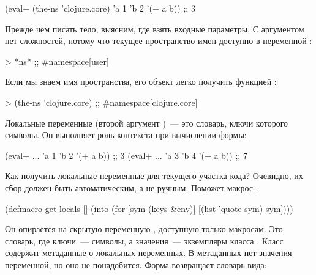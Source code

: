 \begin{english}
  \begin{clojure}
(eval+ (the-ns 'clojure.core)
       {'a 1 'b 2}
       '(+ a b))
;; 3
  \end{clojure}
\end{english}

Прежде чем писать тело, выясним, где взять входные параметры. С аргументом  нет сложностей, потому что текущее пространство имен доступно в переменной :

\begin{english}
  \begin{clojure}
> *ns*
;; #namespace[user]
  \end{clojure}
\end{english}

Если мы знаем имя пространства, его объект легко получить функцией :

\begin{english}
  \begin{clojure}
> (the-ns 'clojure.core)
;; #namespace[clojure.core]
  \end{clojure}
\end{english}

Локальные переменные (второй аргумент )~--- это словарь, ключи которого символы. Он выполняет роль контекста при вычислении формы:

\begin{english}
  \begin{clojure}
(eval+ ... {'a 1 'b 2} '(+ a b)) ;; 3
(eval+ ... {'a 3 'b 4} '(+ a b)) ;; 7
  \end{clojure}
\end{english}

Как получить локальные переменные для текущего участка кода? Очевидно, их сбор должен быть автоматическим, а не ручным. Поможет макрос :

\begin{english}
  \begin{clojure}
(defmacro get-locals []
  (into {} (for [sym (keys &env)]
             [(list 'quote sym) sym])))
  \end{clojure}
\end{english}

Он опирается на скрытую переменную , доступную только макросам. Это словарь, где ключи~--- символы, а значения~--- экземпляры класса . Класс  содержит метаданные о локальных переменных. В метаданных нет значения переменной, но оно не понадобится. Форма  возвращает словарь вида:

